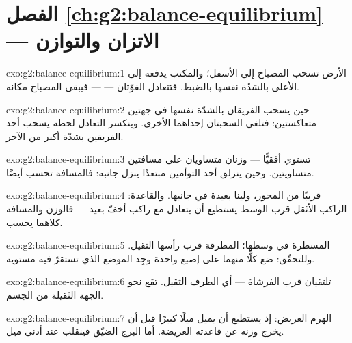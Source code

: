 \section*{الفصل \ref{ch:g2:balance-equilibrium} --- الاتزان والتوازن}

\begin{solution}{exo:g2:balance-equilibrium:1}
الأرض تسحب المصباح إلى الأسفل؛ والمكتب يدفعه إلى الأعلى بالشدّة
نفسها بالضبط. فتتعادل القوّتان ---  --- فيبقى المصباح
مكانه.
\end{solution}

\begin{solution}{exo:g2:balance-equilibrium:2}
حين يسحب الفريقان بالشدّة نفسها في جهتين متعاكستين: فتلغي
السحبتان إحداهما الأخرى. وينكسر التعادل لحظة يسحب أحد الفريقين
بشدّة أكبر من الآخر.
\end{solution}

\begin{solution}{exo:g2:balance-equilibrium:3}
تستوي أفقيًّا --- وزنان متساويان على مسافتين متساويتين. وحين
ينزلق أحد التوأمين مبتعدًا ينزل جانبه: فالمسافة تحسب أيضًا.
\end{solution}

\begin{solution}{exo:g2:balance-equilibrium:4}
قريبًا من المحور، ولينا بعيدة في جانبها. والقاعدة: الراكب الأثقل
قرب الوسط يستطيع أن يتعادل مع راكب أخفّ بعيد --- فالوزن والمسافة
كلاهما يحسب.
\end{solution}

\begin{solution}{exo:g2:balance-equilibrium:5}
 المسطرة في وسطها؛  المطرقة قرب رأسها
الثقيل. وللتحقّق: ضع كلًّا منهما على إصبع واحدة وجِد الموضع
الذي تستقرّ فيه مستوية.
\end{solution}

\begin{solution}{exo:g2:balance-equilibrium:6}
تلتقيان قرب الفرشاة --- أي الطرف الثقيل.  تقع نحو
الجهة الثقيلة من الجسم.
\end{solution}

\begin{solution}{exo:g2:balance-equilibrium:7}
الهرم العريض: إذ يستطيع أن يميل ميلًا كبيرًا قبل أن يخرج وزنه
عن قاعدته العريضة. أما البرج الضيّق فينقلب عند أدنى ميل.
\end{solution}

